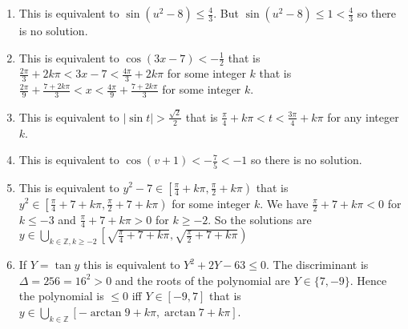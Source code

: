 \begin{enumerate}
\item This is equivalent to $\sin{(u^2-8)} \leq \frac{4}{3}$.
  But $\sin{(u^2-8)} \leq 1 < \frac{4}{3}$ so there is no solution.
\item This is equivalent to
  $\cos{(3x - 7)} < -\frac{1}{2}$
  that is
  $\frac{2\pi}{3} + {2k\pi} < 3x - 7 < \frac{4\pi}{3} + {2k\pi}$ for some
  integer $k$ that is
  $\frac{2\pi}{9} + \frac{7+2k\pi}{3} <x< \frac{4\pi}{9} + \frac{7 + 2k\pi}{3}$
  for some integer $k$.
\item This is equivalent to ${|\sin{t}|} > \frac{\sqrt{2}}{2}$ that
  is $\frac{\pi}{4} + k\pi < t < \frac{3\pi}{4} + k\pi$ for any integer $k$.
\item This is equivalent to $\cos{(v+1)} < -\frac{7}{5} < -1$ so
   there is no solution.
 \item This is equivalent to
   $y^2-7 \in \left[{\frac{\pi}{4}+k\pi},{\frac{\pi}{2}+k\pi}\right)$
   that is
   $y^2 \in \left[{\frac{\pi}{4}+7+k\pi},{\frac{\pi}{2}+7+k\pi}\right)$
     for some integer $k$.
     We have $\frac{\pi}{2}+7+k\pi < 0$ for $k \leq -3$ and
   ${\frac{\pi}{4}+7+k\pi} > 0$ for $k \geq -2$.
     So the solutions are
     $y \in \bigcup_{{k \in \mathbb Z}, k\geq-2}
     \left[\sqrt{{\frac{\pi}{4}+7+k\pi}},
           \sqrt{{\frac{\pi}{2}+7+k\pi}}\right)$

 \item If $Y = \tan{y}$ this is equivalent to
  $Y^2 + 2Y - 63 \leq 0$. The discriminant is
  $\Delta = 256=16^2 > 0$ and the roots of the polynomial are
  $Y \in \{7, -9\}$. Hence the polynomial is $\leq 0$ iff
  $Y \in {[-9, 7]}$ that is
  $y \in \bigcup_{k \in \mathbb Z} [-\arctan{9}+k\pi,\arctan{7}+k\pi]$.
\end{enumerate}
